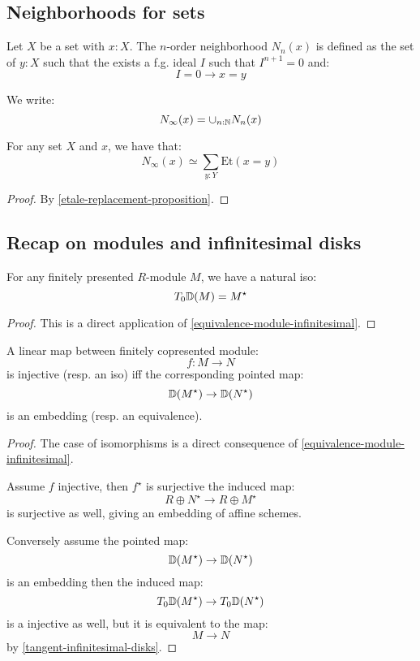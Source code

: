 \subsection{Neighborhoods for sets}

\begin{definition}
Let $X$ be a set with $x:X$. The $n$-order neighborhood $N_n(x)$ is defined as the set of $y:X$ such that the exists a f.g. ideal $I$ such that $I^{n+1}=0$ and:
\[I=0 \to x=y\]
\end{definition}

We write:
\[N_\infty(x) = \cup_{n:\mathbb{N}} N_n(x)\]

\begin{lemma}
For any set $X$ and $x$, we have that:
\[N_\infty(x) \simeq \sum_{y:Y} \mathrm{Et}(x=y)\]
\end{lemma}

\begin{proof}
By \cref{etale-replacement-proposition}.
\end{proof}

\subsection{Recap on modules and infinitesimal disks}

\begin{lemma}\label{tangent-infinitesimal-disks}
For any finitely presented $R$-module $M$, we have a natural iso:
\[T_0\mathbb{D}(M) = M^\star\]
\end{lemma}

\begin{proof}
This is a direct application of \cref{equivalence-module-infinitesimal}.
\end{proof}

\begin{lemma}\label{neighborhood-tangent-correspondence}
A linear map between finitely copresented module:
\[f:M\to N\]
is injective (resp. an iso) iff the corresponding pointed map:
\[\mathbb{D}(M^\star) \to \mathbb{D}(N^\star)\]
is an embedding (resp. an equivalence).
\end{lemma}

\begin{proof}
The case of isomorphisms is a direct consequence of \cref{equivalence-module-infinitesimal}.

Assume $f$ injective, then $f^\star$ is surjective the induced map:
\[R\oplus N^\star \to R\oplus M^\star\]
is surjective as well, giving an embedding of affine schemes. 

Conversely assume the pointed map:
\[\mathbb{D}(M^\star) \to \mathbb{D}(N^\star)\]
is an embedding then the induced map:
\[T_0\mathbb{D}(M^\star) \to T_0\mathbb{D}(N^\star)\]
is a injective as well, but it is equivalent to the map:
\[M\to N\]
by \cref{tangent-infinitesimal-disks}.
\end{proof}

